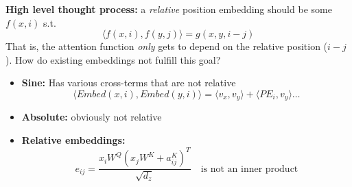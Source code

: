 \small
\textbf{High level thought process:} a \emph{relative} position embedding should be some $f(x, i)$ s.t.
\[ \langle f(x, i), f(y, j) \rangle = g(x, y, i - j) \]
That is, the attention function \emph{only} gets to depend on the relative position ($i-j$). How do existing embeddings not fulfill this goal?
\begin{itemize}
  \item \textbf{Sine:} Has various cross-terms that are not relative
  \[ \langle \mathit{Embed}(x, i), \mathit{Embed}(y, i) \rangle = \langle v_x, v_y \rangle + \langle PE_i, v_y \rangle \ldots \]
  \item \textbf{Absolute:} obviously not relative
  \item \textbf{Relative embeddings:}
  \[ e_{ij} = \frac{x_i W^Q \left(x_j W^K + a_{ij}^K\right)^T}{\sqrt{d_z}} \quad \text{is not an inner product} \]
\end{itemize}
